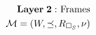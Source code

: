 \documentclass[preview]{standalone}
\begin{document}
\begin{align*}
\special{dvisvgm:raw <g id='unique000'>}\mathbf{Layer\;2:}\text{ Frames}\\\mathcal{M}=(W,\preceq,R_{\Box_S},\nu)\special{dvisvgm:raw </g>}
\end{align*}
\end{document}

